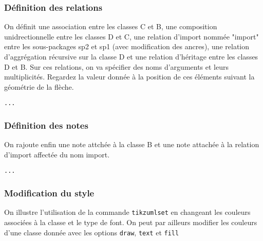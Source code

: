 \documentclass[a4paper,11pt]{report}
\newcommand{\inputTikZ}[1]{%
  }%
\newcommand{\inputTikZ}[1]{%
    \texttt{[image: fig/\#1.pdf]}%
  }%
\begin{document}
\begin{center}
\inputTikZ{figure32}
\end{center}


\subsubsection{Définition des relations}

On définit une association entre les classes C et B, une composition unidrectionnelle entre les classes D et C, une relation d'import nommée "import" entre les sous-packages sp2 et sp1 (avec modification des ancres), une relation d'aggrégation récursive sur la classe D et une relation d'héritage entre les classes D et B. Sur ces relations, on va spécifier des noms d'arguments et leurs multiplicités. Regardez la valeur donnée à la position de ces éléments suivant la géométrie de la flèche.

\medskip

\hspace{-0.7cm}\lstinline{...}
{\color{red!70!black}

}

\begin{center}
\inputTikZ{figure33}
\end{center}

\subsubsection{Définition des notes}

On rajoute enfin une note attchée à la classe B et une note attachée à la relation d'import affectée du nom import.

\medskip

\hspace{-0.7cm}\lstinline{...}
{\color{red!70!black}

}

\begin{center}
\inputTikZ{figure34}
\end{center}

\subsubsection{Modification du style}

On illustre l'utilisation de la commande {\tt tikzumlset} en changeant les couleurs associées à la classe et le type de font. On peut par ailleurs modifier les couleurs d'une classe donnée avec les options {\tt draw}, {\tt text} et {\tt fill}
\end{document}
